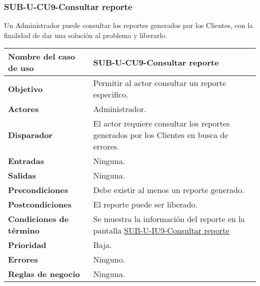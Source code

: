 \subsubsection{SUB-U-CU9-Consultar reporte}\label{SUB-U-CU9}
Un Administrador puede consultar los reportes generados por los Clientes, con la finalidad de dar una solución al problema y liberarlo.

\begin{longtable}{|J{5cm}|J{10.3cm}|}
	\hline
	\textbf{Nombre del caso de uso} &
		SUB-U-CU9-Consultar reporte \\ \hline
	\textbf{Objetivo} &
		Permitir al actor consultar un reporte especifico. \\ \hline
	\textbf{Actores} & Administrador.
		 \\ \hline 
	\textbf{Disparador} & 
		El actor requiere consultar los reportes generados por los Clientes en busca de errores. \\ \hline 
	\textbf{Entradas} & Ninguna.
		\\ \hline 
	\textbf{Salidas} & Ninguna.
		\\ \hline
	\textbf{Precondiciones} &
		Debe existir al menos un reporte generado.\\ \hline
	\textbf{Postcondiciones} & El reporte puede ser liberado.
		\\ \hline
	\textbf{Condiciones de término} & Se muestra la información del reporte en la pantalla \hyperref[fig:sub-u-iu9]{SUB-U-IU9-Consultar reporte}
		\\ \hline 
	\textbf{Prioridad} & 
		Baja. \\ \hline
	\textbf{Errores} & Ninguno.
		\\ \hline
	\textbf{Reglas de negocio} & Ninguna.
		 \\ \hline
\end{longtable}

